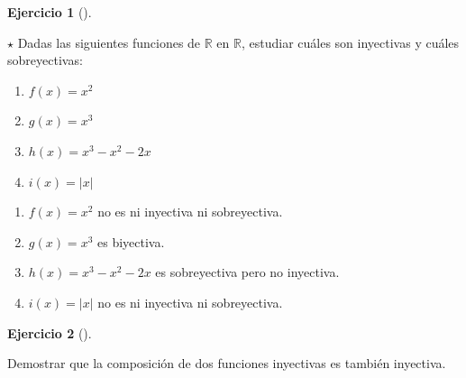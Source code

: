 \documentclass[
  spanish,
  a4paper,
]{scrreport}
\providecommand{\tightlist}{%
  \setlength{\itemsep}{0pt}\setlength{\parskip}{0pt}}
\theoremstyle{definition}
\newtheorem{exercise}{Ejercicio}[chapter]
\theoremstyle{remark}
\begin{document}
\begin{exercise}[]\protect\hypertarget{exr-tipos-funciones}{}\label{exr-tipos-funciones}

\(\star\) Dadas las siguientes funciones de \(\mathbb{R}\) en
\(\mathbb{R}\), estudiar cuáles son inyectivas y cuáles sobreyectivas:

\begin{enumerate}
\def\labelenumi{\alph{enumi}.}
\tightlist
\item
  \(f(x)=x^2\)
\item
  \(g(x)=x^3\)
\item
  \(h(x)=x^3-x^2-2x\)
\item
  \(i(x)=|x|\)
\end{enumerate}

\end{exercise}

\begin{tcolorbox}[enhanced jigsaw, arc=.35mm, bottomrule=.15mm, bottomtitle=1mm, breakable, colback=white, colbacktitle=quarto-callout-tip-color!10!white, colframe=quarto-callout-tip-color-frame, coltitle=black, left=2mm, leftrule=.75mm, opacityback=0, opacitybacktitle=0.6, rightrule=.15mm, title=\textcolor{quarto-callout-tip-color}{\faLightbulb}\hspace{0.5em}{Solución}, titlerule=0mm, toprule=.15mm, toptitle=1mm]

\begin{enumerate}
\def\labelenumi{\alph{enumi}.}
\tightlist
\item
  \(f(x)=x^2\) no es ni inyectiva ni sobreyectiva.
\item
  \(g(x)=x^3\) es biyectiva.
\item
  \(h(x)=x^3-x^2-2x\) es sobreyectiva pero no inyectiva.
\item
  \(i(x)=|x|\) no es ni inyectiva ni sobreyectiva.
\end{enumerate}

\end{tcolorbox}

\begin{exercise}[]\protect\hypertarget{exr-composicion-funciones-inyectivas}{}\label{exr-composicion-funciones-inyectivas}

Demostrar que la composición de dos funciones inyectivas es también
inyectiva.

\end{exercise}
\end{document}
